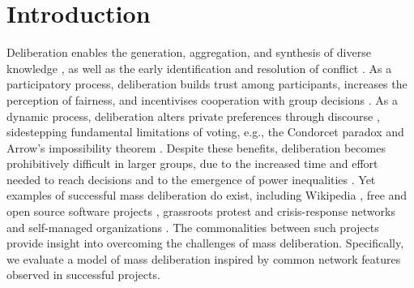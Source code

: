 \section{Introduction}

Deliberation enables the generation, aggregation, and synthesis of diverse knowledge \cite{dewey_creative_1940, anderson_epistemology_2006, ackerman_deliberation_2002, ostrom_collective_2000},
as well as the early identification and resolution of conflict \cite{gentry_consensus_1982}.
As a participatory process, deliberation builds trust among participants, increases the perception of fairness, and incentivises cooperation with group decisions
\cite{ostrom_collective_2000, bowles_endogenous_1998}.
As a dynamic process, deliberation alters private preferences through discourse \cite{habermas_structural_1991}, sidestepping fundamental limitations of voting, e.g., the Condorcet paradox \cite{condorcet_essay_1785, brandt_computational_2012} and Arrow's impossibility theorem \cite{arrow_social_2012, brandt_computational_2012}.
Despite these benefits, deliberation becomes prohibitively difficult in larger groups, due to the increased time and effort needed to reach decisions \cite{fishkin_voice_1997, gentry_consensus_1982} and to the emergence of power inequalities \cite{freeman_tyranny_1972, boehm_egalitarian_1993}.
Yet examples of successful mass deliberation do exist, including Wikipedia \cite{giles_internet_2005, keegan_evolution_2017}, free and open source software projects \cite{benkler_coases_2002}, grassroots protest and crisis-response networks \cite{gonzalez-bailon_networked_2016, brugh_combining_2019} and self-managed organizations \cite{laloux_reinventing_2014}.
The commonalities between such projects provide insight into overcoming the challenges of mass deliberation.
Specifically, we evaluate a model of mass deliberation inspired by common network features observed in successful projects.

